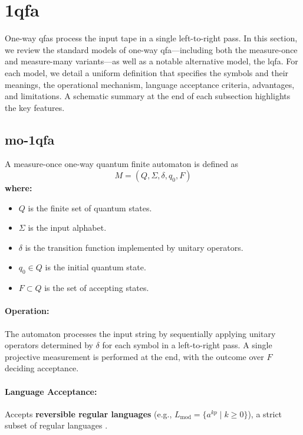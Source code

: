 \section{\gls{1qfa}}
\label{sec:one-way-qfas}

One-way \glspl{qfa} process the input tape in a single left-to-right pass. In this section, we review the standard models of one-way \gls{qfa}—including both the measure-once and measure-many variants—as well as a notable alternative model, the \gls{lqfa}. For each model, we detail a uniform definition that specifies the symbols and their meanings, the operational mechanism, language acceptance criteria, advantages, and limitations. A schematic summary at the end of each subsection highlights the key features.

\subsection{\acrfull{mo-1qfa}}
\label{subsec:mo-1qfa}
\begin{definition}
A measure-once one-way quantum finite automaton is defined as 
\[
M = (Q, \Sigma, \delta, q_0, F)
\]
\textbf{where:}
\begin{itemize}
    \item \( Q \) is the finite set of quantum states.
    \item \( \Sigma \) is the input alphabet.
    \item \( \delta \) is the transition function implemented by unitary operators.
    \item \( q_0 \in Q \) is the initial quantum state.
    \item \( F \subset Q \) is the set of accepting states.
\end{itemize}
\end{definition}

\paragraph{Operation:}  
The automaton processes the input string by sequentially applying unitary operators determined by \( \delta \) for each symbol in a left-to-right pass. A single projective measurement is performed at the end, with the outcome over \( F \) deciding acceptance.

\paragraph{Language Acceptance:}  
Accepts \textbf{reversible regular languages} (e.g., \( L_{\text{mod}} = \{a^{kp} \mid k \geq 0\} \)), a strict subset of regular languages \cite{kondacs1997power}.
